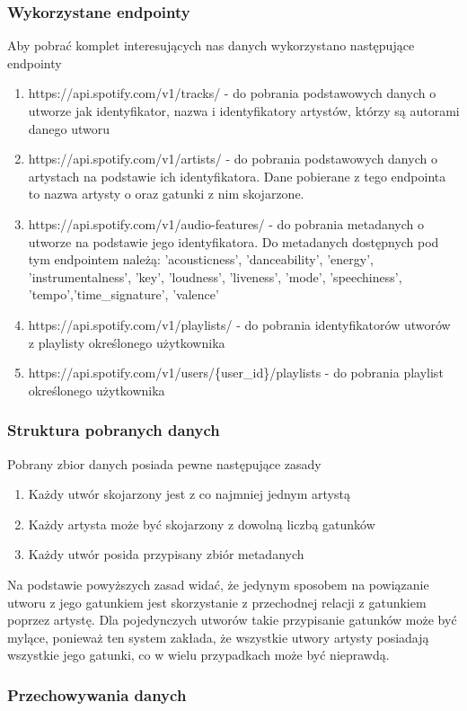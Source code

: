 \begin{multicols}{2}
\subsubsection{Wykorzystane endpointy}
Aby pobrać komplet interesujących nas danych wykorzystano następujące endpointy
\begin{enumerate}
    \item {https://api.spotify.com/v1/tracks/ - do pobrania podstawowych danych o utworze jak identyfikator, nazwa i identyfikatory artystów, którzy są autorami danego utworu}
    \item {https://api.spotify.com/v1/artists/ - do pobrania podstawowych danych o artystach na podstawie ich identyfikatora. Dane pobierane z tego endpointa to nazwa artysty o oraz gatunki z nim skojarzone.}
    \item {https://api.spotify.com/v1/audio-features/ - do pobrania metadanych o utworze na podstawie jego identyfikatora. Do metadanych dostępnych pod tym endpointem należą: 'acousticness', 'danceability', 'energy', 'instrumentalness', 'key', 'loudness', 'liveness', 'mode', 'speechiness', 'tempo','time\_signature', 'valence'}
    \item{https://api.spotify.com/v1/playlists/ - do pobrania identyfikatorów utworów z playlisty określonego użytkownika}
    \item{https://api.spotify.com/v1/users/\{user\_id\}/playlists - do pobrania 
    playlist określonego użytkownika}
\end{enumerate}

\subsubsection{Struktura pobranych danych}
Pobrany zbior danych posiada pewne następujące zasady
\begin{enumerate}
    \item {Każdy utwór skojarzony jest z co najmniej jednym artystą}
    \item {Każdy artysta może być skojarzony z dowolną liczbą gatunków}
    \item {Każdy utwór posida przypisany zbiór metadanych}
\end{enumerate}
Na podstawie powyższych zasad widać, że jedynym sposobem na powiązanie utworu z jego gatunkiem jest skorzystanie z przechodnej relacji z gatunkiem poprzez artystę. Dla pojedynczych utworów takie przypisanie gatunków może być mylące, ponieważ ten system zakłada, że wszystkie utwory artysty posiadają wszystkie jego gatunki, co w wielu przypadkach może być nieprawdą. 

\subsubsection{Przechowywania danych}

\end{multicols}